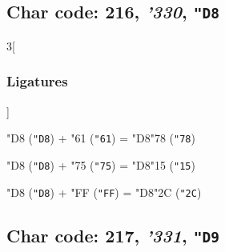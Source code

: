 \documentclass{article}
\newlength{\maxcharwidth}
\begin{document}
\subsection{Char code: 216, {\it'330}, {\tt"D8}}
\label{char_216}


\begin{multicols}{3}[\subsubsection{Ligatures}]

{\testfont\char"D8\noboundary} ({\tt"D8}) + {\testfont\char"61\noboundary} ({\tt"61}) = {\testfont\char"D8\noboundary}{\testfont\char"78\noboundary} ({\tt"78}) 

{\testfont\char"D8\noboundary} ({\tt"D8}) + {\testfont\char"75\noboundary} ({\tt"75}) = {\testfont\char"D8\noboundary}{\testfont\char"15\noboundary} ({\tt"15}) 

{\testfont\char"D8\noboundary} ({\tt"D8}) + {\testfont\char"FF\noboundary} ({\tt"FF}) = {\testfont\char"D8\noboundary}{\testfont\char"2C\noboundary} ({\tt"2C}) 

\end{multicols}

\subsection{Char code: 217, {\it'331}, {\tt"D9}}
\label{char_217}

\end{document}

